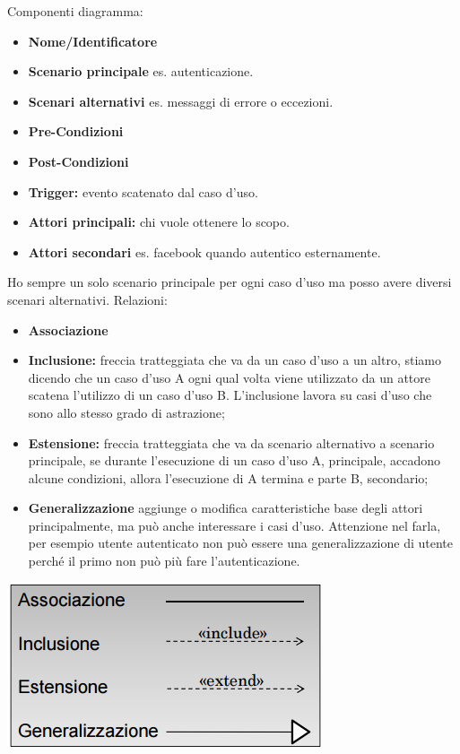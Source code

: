 Componenti diagramma:
\begin{itemize}
	\item \textbf{Nome/Identificatore}
	\item \textbf{Scenario principale} es. autenticazione.
	\item \textbf{Scenari alternativi} es. messaggi di errore o eccezioni.
	\item \textbf{Pre-Condizioni}
	\item \textbf{Post-Condizioni}
	\item \textbf{Trigger:} evento scatenato dal caso d'uso.
	\item \textbf{Attori principali:} chi vuole ottenere lo scopo.
	\item \textbf{Attori secondari} es. facebook quando autentico esternamente.
\end{itemize}
Ho sempre un solo scenario principale per ogni caso d'uso ma posso avere diversi scenari alternativi.
Relazioni:
\begin{itemize}
	\item \textbf{Associazione}
	\item \textbf{Inclusione:} freccia tratteggiata che va da un caso d'uso a un altro, stiamo dicendo che un caso d'uso A ogni qual volta viene utilizzato da un attore scatena l'utilizzo di un caso d'uso B. L'inclusione lavora su casi d'uso che sono allo stesso grado di astrazione;
	\item \textbf{Estensione:} freccia tratteggiata che va da scenario alternativo a scenario principale, se durante l'esecuzione di un caso d'uso A, principale, accadono alcune condizioni, allora l'esecuzione di A termina e parte B, secondario;
	\item \textbf{Generalizzazione} aggiunge o modifica caratteristiche base degli attori principalmente, ma può anche interessare i casi d'uso. Attenzione nel farla, per esempio utente autenticato non può essere una generalizzazione di utente perché il primo non può più fare l'autenticazione.
\end{itemize} 
\includegraphics[width=0.75\columnwidth]{img9}

